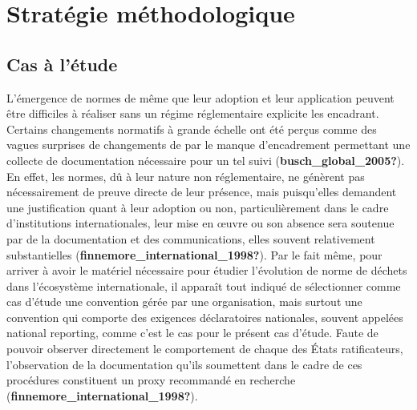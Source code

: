 \documentclass[12pt]{ulaval}
\begin{document}
\section{Stratégie méthodologique}\label{stratuxe9gie-muxe9thodologique}

\subsection{Cas à l'étude}\label{cas-uxe0-luxe9tude}

L'émergence de normes de même que leur adoption et leur application peuvent être difficiles à réaliser sans un régime réglementaire explicite les encadrant. Certains changements normatifs à grande échelle ont été perçus comme des vagues surprises de changements de par le manque d'encadrement permettant une collecte de documentation nécessaire pour un tel suivi (\textbf{busch\_global\_2005?}). En effet, les normes, dû à leur nature non réglementaire, ne génèrent pas nécessairement de preuve directe de leur présence, mais puisqu'elles demandent une justification quant à leur adoption ou non, particulièrement dans le cadre d'institutions internationales, leur mise en œuvre ou son absence sera soutenue par de la documentation et des communications, elles souvent relativement substantielles (\textbf{finnemore\_international\_1998?}). Par le fait même, pour arriver à avoir le matériel nécessaire pour étudier l'évolution de norme de déchets dans l'écosystème internationale, il apparaît tout indiqué de sélectionner comme cas d'étude une convention gérée par une organisation, mais surtout une convention qui comporte des exigences déclaratoires nationales, souvent appelées national reporting, comme c'est le cas pour le présent cas d'étude. Faute de pouvoir observer directement le comportement de chaque des États ratificateurs, l'observation de la documentation qu'ils soumettent dans le cadre de ces procédures constituent un proxy recommandé en recherche (\textbf{finnemore\_international\_1998?}).
\end{document}

